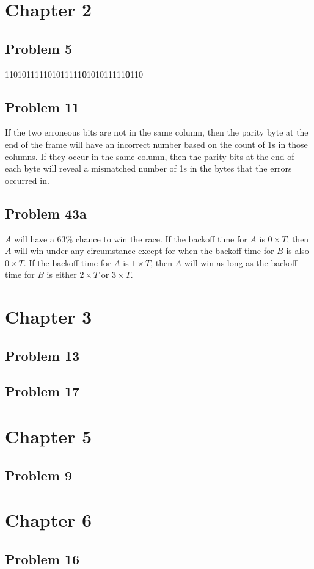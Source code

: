 \documentclass{article}%
\begin{document}
\section*{Chapter 2}
\subsection*{Problem 5}
110101111101011111\textbf{0}101011111\textbf{0}110


\subsection*{Problem 11}
If the two erroneous bits are not in the same column, then the parity byte at the end of the frame will
have an incorrect number based on the count of 1s in those columns. If they occur in the same column,
then the parity bits at the end of each byte will reveal a mismatched number of 1s in the bytes that the
errors occurred in.


\subsection*{Problem 43a}
$A$ will have a $63\%$ chance to win the race. If the backoff time for $A$ is $0 \times T$, then $A$ will win under
any circumstance except for when the backoff time for $B$ is also $0 \times T$. If the backoff time for $A$ is $1 \times T$,
then $A$ will win as long as the backoff time for $B$ is either $2 \times T$ or $3 \times T$.


\section*{Chapter 3}
\subsection*{Problem 13}
\subsection*{Problem 17}
\section*{Chapter 5}
\subsection*{Problem 9}
\section*{Chapter 6}
\subsection*{Problem 16}
\end{document}

